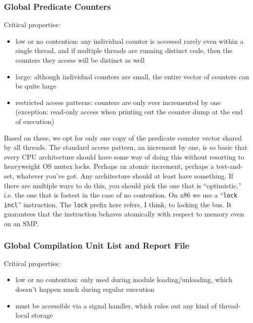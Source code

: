 \documentclass[times,10pt,twocolumn]{article}
\begin{document}
\subsubsection{Global Predicate Counters}

Critical properties:

\begin{itemize}
\item low or no contention: any individual counter is accessed rarely
  even within a single thread, and if multiple threads are running
  distinct code, then the counters they access will be distinct as
  well
\item large: although individual counters are small, the entire vector
  of counters can be quite large
\item restricted access patterns: counters are only ever incremented
  by one (exception: read-only access when printing out the counter
  dump at the end of execution)
\end{itemize}

Based on these, we opt for only one copy of the predicate counter
vector shared by all threads.  The standard access pattern, an
increment by one, is so basic that every CPU architecture should have
some way of doing this without resorting to heavyweight OS mutex
locks.  Perhaps an atomic increment, perhaps a test-and-set, whatever
you've got.  Any architecture should at least have something.  If
there are multiple ways to do this, you should pick the one that is
``optimistic,'' i.e. the one that is fastest in the case of no
contention.  On x86 we use a ``\texttt{lock incl}'' instruction.  The
\texttt{lock} prefix here refers, I think, to locking the bus.  It
guarantees that the instruction behaves atomically with respect to
memory even on an SMP.

\subsubsection{Global Compilation Unit List and Report File}

Critical properties:

\begin{itemize}
\item low or no contention: only used during module loading/unloading,
  which doesn't happen much during regular execution
\item must be accessible via a signal handler, which rules out any
  kind of thread-local storage
\end{itemize}
\end{document}
